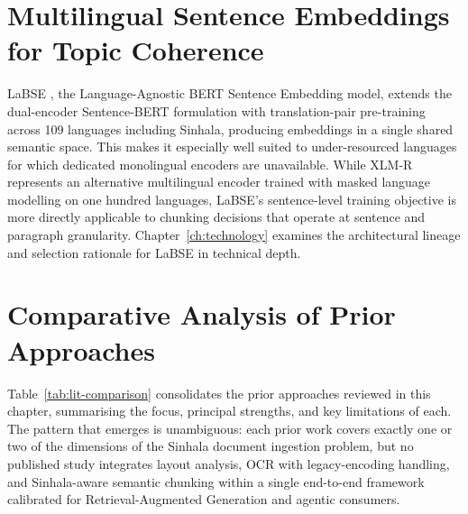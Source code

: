 \documentclass[12pt,a4paper,oneside]{report}
\begin{document}
\section{Multilingual Sentence Embeddings for Topic Coherence}
\label{sec:lit-embeddings}
LaBSE \cite{feng2022labse}, the Language-Agnostic BERT Sentence Embedding model, extends the dual-encoder Sentence-BERT formulation \cite{reimers2019sbert} with translation-pair pre-training across 109 languages including Sinhala, producing embeddings in a single shared semantic space. This makes it especially well suited to under-resourced languages for which dedicated monolingual encoders are unavailable. While XLM-R \cite{conneau2020xlmr} represents an alternative multilingual encoder trained with masked language modelling on one hundred languages, LaBSE's sentence-level training objective is more directly applicable to chunking decisions that operate at sentence and paragraph granularity. Chapter~\ref{ch:technology} examines the architectural lineage and selection rationale for LaBSE in technical depth.

\section{Comparative Analysis of Prior Approaches}
\label{sec:lit-comparison}

Table~\ref{tab:lit-comparison} consolidates the prior approaches reviewed in this chapter, summarising the focus, principal strengths, and key limitations of each. The pattern that emerges is unambiguous: each prior work covers exactly one or two of the dimensions of the Sinhala document ingestion problem, but no published study integrates layout analysis, OCR with legacy-encoding handling, and Sinhala-aware semantic chunking within a single end-to-end framework calibrated for Retrieval-Augmented Generation and agentic consumers.
\end{document}
